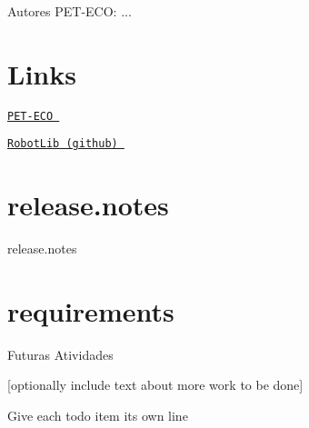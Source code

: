\begin{DoxyAuthor}{Autores}
P\-E\-T-\/\-E\-C\-O\-: ...
\end{DoxyAuthor}




 \hypertarget{index_Links}{}\section{Links}\label{index_Links}
\href{http://dainf.ct.utfpr.edu.br/peteco/}{\tt P\-E\-T-\/\-E\-C\-O } 

\href{https://github.com/anderson-/RobotLib}{\tt Robot\-Lib (github) } 



 \hypertarget{index_notes}{}\section{release.\-notes}\label{index_notes}
release.\-notes 

 \hypertarget{index_requirements}{}\section{requirements}\label{index_requirements}

\begin{DoxyVerbInclude}
\end{DoxyVerbInclude}
 

 \begin{DoxyRefDesc}{Futuras Atividades}
\item[\hyperlink{todo__todo000001}{Futuras Atividades}]\mbox{[}optionally include text about more work to be done\mbox{]} 

Give each todo item its own line\end{DoxyRefDesc}
